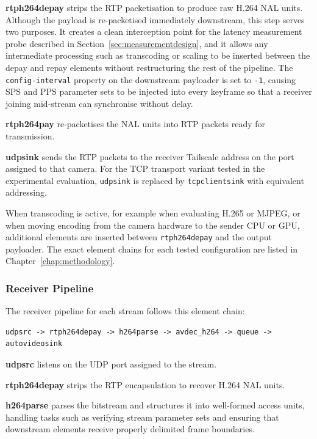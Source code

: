 \textbf{rtph264depay} strips the RTP packetisation to produce raw H.264 NAL units. Although the payload is re-packetised immediately downstream, this step serves two purposes. It creates a clean interception point for the latency measurement probe described in Section~\ref{sec:measurementdesign}, and it allows any intermediate processing such as transcoding or scaling to be inserted between the depay and repay elements without restructuring the rest of the pipeline. The \texttt{config-interval} property on the downstream payloader is set to \texttt{-1}, causing SPS and PPS parameter sets to be injected into every keyframe so that a receiver joining mid-stream can synchronise without delay.

\textbf{rtph264pay} re-packetises the NAL units into RTP packets ready for transmission.

\textbf{udpsink} sends the RTP packets to the receiver Tailscale address on the port assigned to that camera. For the TCP transport variant tested in the experimental evaluation, \texttt{udpsink} is replaced by \texttt{tcpclientsink} with equivalent addressing.

When transcoding is active, for example when evaluating H.265 or MJPEG, or when moving encoding from the camera hardware to the sender CPU or GPU, additional elements are inserted between \texttt{rtph264depay} and the output payloader. The exact element chains for each tested configuration are listed in Chapter~\ref{chap:methodology}.

\subsubsection{Receiver Pipeline}

The receiver pipeline for each stream follows this element chain:

\begin{verbatim}
udpsrc -> rtph264depay -> h264parse -> avdec_h264 -> queue -> autovideosink
\end{verbatim}

\textbf{udpsrc} listens on the UDP port assigned to the stream.

\textbf{rtph264depay} strips the RTP encapsulation to recover H.264 NAL units.

\textbf{h264parse} parses the bitstream and structures it into well-formed access units, handling tasks such as verifying stream parameter sets and ensuring that downstream elements receive properly delimited frame boundaries.

